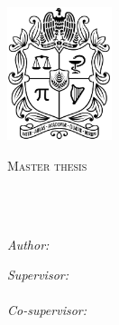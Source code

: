 \documentclass[
11pt, %
english, %
singlespacing, %
headsepline, %
]{MastersDoctoralThesis} %
\author{Elkin Alejandro \textsc{Cruz Camacho}} %
\begin{document}
\frontmatter %

\pagestyle{plain} %


\begin{titlepage}
\begin{center}

\vspace*{.06\textheight}
\includegraphics[width=0.23\textwidth]{figures/escudo.png}\\
{\scshape\LARGE \univname\par}\vspace{1.2cm} %
\textsc{\Large Master thesis}\\[0.3cm] %

\HRule \\[0.4cm] %
{\huge \bfseries \ttitle\par}\vspace{0.4cm} %
\HRule \\[8mm] %

\begin{minipage}[t]{0.4\textwidth}
\begin{flushleft} \large
\emph{Author:}\\
\authorname
\end{flushleft}
\end{minipage}
\begin{minipage}[t]{0.4\textwidth}
\begin{flushright} \large
\emph{Supervisor:} \\
\supname
\\[2mm]
\emph{Co-supervisor:} \\
\cosupname

\end{flushright}
\end{minipage}\\[8mm]


\end{center}
\end{titlepage}
\end{document}
